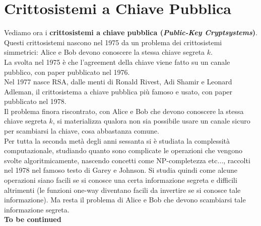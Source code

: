 \documentclass[a4paper,12pt, oneside]{book}
\begin{document}
\section{Crittosistemi a Chiave Pubblica}
Vediamo ora i \textbf{crittosistemi a chiave pubblica (\textit{Public-Key
    Cryptsystems})}.\\
Questi crittosistemi nascono nel 1975 da un problema dei crittosistemi
simmetrici: Alice e Bob devono conoscere la stessa chiave segreta $k$. \\
La svolta nel 1975 è che l'agreement della chiave viene fatto su un canale
pubblico, con paper pubblicato nel 1976.\\
Nel 1977 nasce RSA, dalle menti di Ronald Rivest, Adi Shamir e Leonard
Adleman, il crittosistema a chiave pubblica più famoso e usato, con 
paper pubblicato nel 1978.\\
Il problema finora riscontrato, con Alice e Bob che devono conoscere la stessa
chiave segreta $k$, si materializza qualora non sia possibile usare un canale
sicuro per scambiarsi la chiave, cosa abbastanza comune. \\
Per tutta la seconda metà degli anni sessanta si è studiata la complessità
computazionale, studiando quanto sono complicate le operazioni che vengono
svolte algoritmicamente, nascendo concetti come NP-completezza etc$\ldots$,
raccolti nel 1978 nel famoso testo di Garey e Johnson. Si studia quindi come
alcune operazioni siano facili se si conosce una certa informazione segreta e
difficili altrimenti (le funzioni one-way diventano facili da invertire se si
conosce tale informazione). Ma resta il problema di Alice e Bob che devono
scambiarsi tale informazione segreta.\\
\textbf{To be continued}
\end{document}
